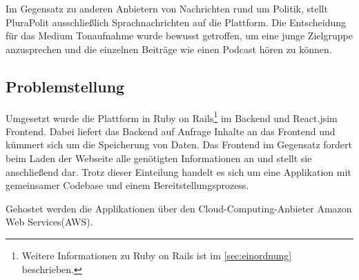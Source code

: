 Im Gegensatz zu anderen Anbietern von Nachrichten rund um Politik, stellt PluraPolit ausschließlich Sprachnachrichten auf die Plattform. Die Entscheidung für das Medium Tonaufnahme wurde bewusst getroffen, um eine junge Zielgruppe anzusprechen und die einzelnen Beiträge wie einen Podcast hören zu können.

\subsection{Problemstellung}

Umgesetzt wurde die Plattform in Ruby on Rails\footnote{Weitere Informationen zu Ruby on Rails ist im \cref{sec:einordnung} beschrieben.} im Backend und React.js\footnotemark im Frontend. Dabei liefert das Backend auf Anfrage Inhalte an das Frontend und kümmert sich um die Speicherung von Daten. Das Frontend im Gegensatz fordert beim Laden der Webseite alle genötigten Informationen an und stellt sie anschließend dar. Trotz dieser Einteilung handelt es sich um eine Applikation mit gemeinsamer Codebase und einem Bereitstellungsprozess.


Gehostet werden die Applikationen über den Cloud-Computing-Anbieter Amazon Web Services\footnotemark (AWS).

